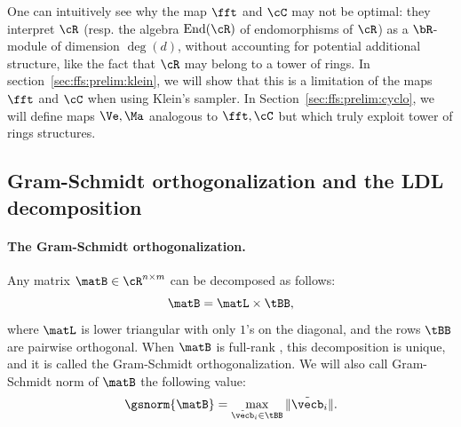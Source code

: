 One can intuitively see why the map $\fft$ and $\cC$ may not be optimal: they interpret $\cR$ (resp. the algebra $\text{End}(\cR)$ of endomorphisms of $\cR$) as a $\bR$-module of dimension $\deg(d)$, without accounting for potential additional structure, like the fact that $\cR$ may belong to a tower of rings. In section~\ref{sec:ffs:prelim:klein}, we will show that this is a limitation of the maps $\fft$ and $\cC$ when using Klein's sampler. In Section~\ref{sec:ffs:prelim:cyclo}, we will define maps $\Ve,\Ma$ analogous to $\fft,\cC$ but which truly exploit tower of rings structures.



\subsection{Gram-Schmidt orthogonalization and the LDL decomposition}\label{sec:ffs:prelim:gso}

%
%

\paragraph{The Gram-Schmidt orthogonalization.}
Any matrix $\matB \in \cR^{n \times m}$ can be decomposed as follows:
\begin{equation}
 \matB = \matL \times \tBB,
\end{equation}
where $\matL$ is lower triangular with only $1$'s on the diagonal, and the rows $\tBB$ are pairwise orthogonal. When $\matB$ is full-rank , this decomposition is unique, and it is called the Gram-Schmidt orthogonalization.
We will also call Gram-Schmidt norm of $\matB$ the following value:
\begin{equation}
 \gsnorm{\matB} = \max_{\tilde\vecb_i \in \tBB} \|\tilde\vecb_i\|.
\end{equation}

